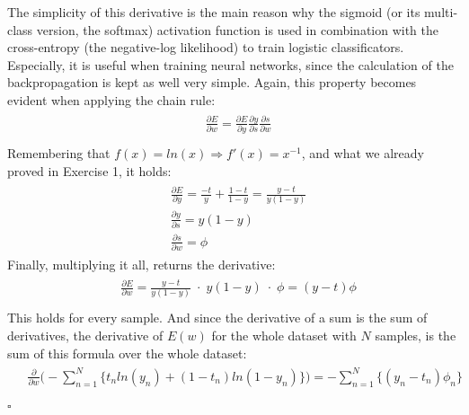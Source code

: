 \documentclass[11pt]{scrartcl} %
\begin{document}
                      The simplicity of this derivative is the main reason why the sigmoid (or its multi-class version, the softmax) activation function is used in combination with the cross-entropy (the negative-log likelihood) to train logistic classificators. Especially, it is useful when training neural networks, since the calculation of the backpropagation is kept as well very simple. Again, this property becomes evident when applying the chain rule:
                      \begin{align*}
                        \begin{aligned}
                          &\frac{\partial E}{\partial w} = \frac{\partial E}{\partial y}\frac{\partial y}{\partial s}\frac{\partial s}{\partial w}\\
                        \end{aligned}
                      \end{align*}
                      Remembering that \(f(x) = ln(x) \Rightarrow f'(x) = x^{-1} \), and what we already proved in Exercise 1, it holds:
                      \begin{align*}
                        \begin{aligned}
                          & \frac{\partial E}{\partial y} = \frac{-t}{y} + \frac{1-t}{1-y} = \frac{y-t}{y (1-y)}\\
                          & \frac{\partial y}{\partial s} = y(1-y)\\
                          & \frac{\partial s}{\partial w} = \phi
                        \end{aligned}
                      \end{align*}
                      Finally, multiplying it all, returns the derivative:
                      \begin{align*}
                        \begin{aligned}
                          &\frac{\partial E}{\partial w} = \frac{y-t}{y (1-y)} \; \cdot \;  y(1-y) \; \cdot \; \phi = (y-t) \phi\\
                        \end{aligned}
                      \end{align*}
                      This holds for every sample. And since the derivative of a sum is the sum of derivatives, the derivative of \(E(w)\) for the whole dataset with \(N\) samples, is the sum of this formula over the whole dataset:
                      \begin{align*}
                        \begin{aligned}
                          &\frac{\partial}{\partial w} \Big( -\sum_{n=1}^{N}\{t_n ln(y_n) + (1-t_n) ln(1-y_n)\} \Big) = -\sum_{n=1}^{N}\{ (y_n - t_n) \phi_n \}
                        \end{aligned}
                      \end{align*}

                      \begin{flushright}
                        $\square$\\
                      \end{flushright}
\end{document}
